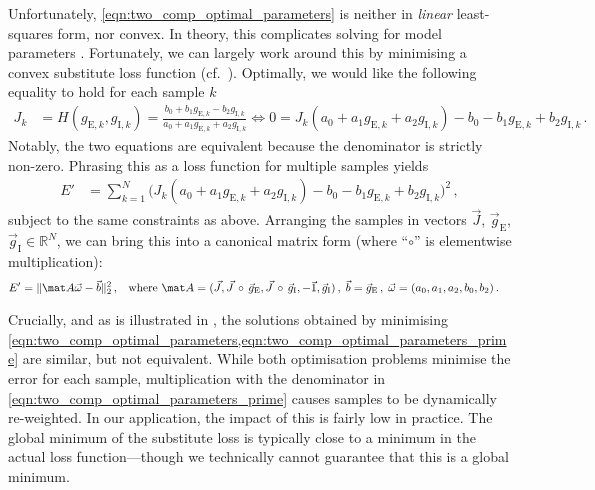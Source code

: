 Unfortunately, \cref{eqn:two_comp_optimal_parameters} is neither in \emph{linear} least-squares form, nor convex.
In theory, this complicates solving for model parameters \citep{rockafellar1993lagrange}.
Fortunately, we can largely work around this by minimising a convex substitute loss function (cf.~).
Optimally, we would like the following equality to hold for each sample $k$
\begin{align*}
	J_k &= H(g_{\mathrm{E}, k}, g_{\mathrm{I}, k}) = \frac{
		b_0 + b_1 g_{\mathrm{E}, k} - b_2 g_{\mathrm{I}, k}
	}{
		a_0 + a_1 g_{\mathrm{E}, k} + a_2 g_{\mathrm{I}, k}
 	} \Leftrightarrow 0 = J_k (a_0 + a_1 g_{\mathrm{E}, k} + a_2 g_{\mathrm{I}, k}) - b_0 - b_1 g_{\mathrm{E}, k} + b_2 g_{\mathrm{I}, k} \,.
\end{align*}
Notably, the two equations are equivalent because the denominator is strictly non-zero.
Phrasing this as a loss function for multiple samples yields
\begin{align}
	E' &= \sum_{k = 1}^N \bigl( J_k (a_0 + a_1 g_{\mathrm{E}, k} + a_2 g_{\mathrm{I}, k}) - b_0 - b_1 g_{\mathrm{E}, k} + b_2 g_{\mathrm{I}, k} \bigr)^2 \,,
	\label{eqn:two_comp_optimal_parameters_prime}
\end{align}
subject to the same constraints as above.
Arranging the samples in vectors $\vec J$, $\vec g_\mathrm{E}$, $\vec g_\mathrm{I} \in \mathbb{R}^N$, we can bring this into a canonical matrix form (where \enquote{$\circ$} is elementwise multiplication):
\begin{align}
	E' &= \|\mat A \vec \omega - \vec b \|_2^2 \,, & \text{where } \mat A = (\vec J, \vec J \, \circ \,  \vec g_\mathrm{E}, \vec J \, \circ \, \vec g_\mathrm{I}, -\vec{1}, \vec{g}_\mathrm{I}) \,, \; \vec b = \vec{g}_\mathrm{E} \,, \; \vec \omega &= (a_0, a_1, a_2, b_0, b_2) \,.
	\label{eqn:two_comp_optimal_parameters_prime_matrix}
\end{align}

Crucially, and as is illustrated in , the solutions obtained by minimising \cref{eqn:two_comp_optimal_parameters,eqn:two_comp_optimal_parameters_prime} are similar, but not equivalent.
While both optimisation problems minimise the error for each sample, multiplication with the denominator in \cref{eqn:two_comp_optimal_parameters_prime} causes samples to be dynamically re-weighted.
In our application, the impact of this is fairly low in practice.
The global minimum of the substitute loss is typically close to a minimum in the actual loss function---though we technically cannot guarantee that this is a global minimum.

